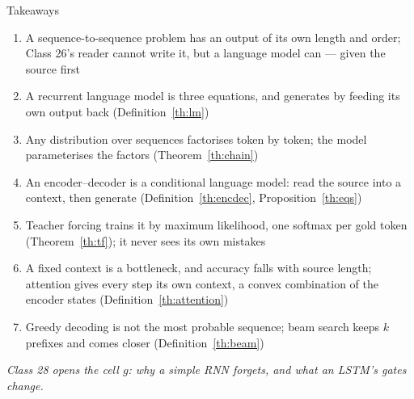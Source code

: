 \documentclass[aspectratio=169, 11pt]{beamer}
\newcommand{\bridge}[1]{%
  {\scriptsize\itshape\color{mcMuted} #1\par}\vspace{0.35em}}
\begin{document}
\begin{frame}{Takeaways}
  \vspace{-0.1em}
  {\scriptsize
  \begin{enumerate}\itemsep0.24em
    \item A sequence-to-sequence problem has an output of its own length
          and order; Class 26's reader cannot write it, but a language
          model can --- given the source first
    \item A recurrent language model is three equations, and generates
          by feeding its own output back (Definition~\ref{th:lm})
    \item Any distribution over sequences factorises token by token; the
          model parameterises the factors (Theorem~\ref{th:chain})
    \item An encoder--decoder is a conditional language model: read the
          source into a context, then generate
          (Definition~\ref{th:encdec}, Proposition~\ref{th:eqs})
    \item Teacher forcing trains it by maximum likelihood, one softmax
          per gold token (Theorem~\ref{th:tf}); it never sees its own
          mistakes
    \item A fixed context is a bottleneck, and accuracy falls with source
          length; attention gives every step its own context, a convex
          combination of the encoder states (Definition~\ref{th:attention})
    \item Greedy decoding is not the most probable sequence; beam search
          keeps $k$ prefixes and comes closer (Definition~\ref{th:beam})
  \end{enumerate}}
  \vspace{-0.2em}
  \bridge{Class 28 opens the cell $g$: why a simple RNN forgets, and
  what an LSTM's gates change.}
\end{frame}
\end{document}
